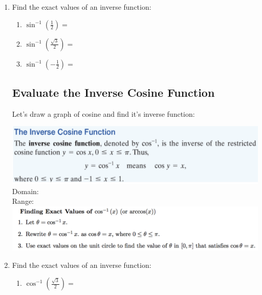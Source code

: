 \begin{enumerate}
\vspace{-.1in}
\item Find the exact values of an inverse function:

\begin{enumerate} 
\item $\displaystyle \sin^{-1}\left(\frac{1}{2}\right)=$\\[.5in]

\item $\displaystyle \sin^{-1}\left(\frac{\sqrt{3}}{2}\right)=$\\[.5in]

\item $\displaystyle \sin^{-1}\left(-\frac{1}{2}\right)=$\\[.5in]
\end{enumerate}




\subsection{Evaluate the Inverse Cosine Function}

Let's draw a graph of cosine and find it's inverse function:
\vfill

\includegraphics[scale=.7]{cosineinverse}\\
\noindent Domain:\\[.5in]
\noindent Range:\\

\newpage
\includegraphics[scale=.7]{findingcosineinverse}\\




\vspace{-.1in}
\item Find the exact values of an inverse function:
 \begin{enumerate}
\item $\displaystyle \cos^{-1}\left(\frac{\sqrt{3}}{2}\right)=$\\[.5in]


\end{enumerate}
\end{enumerate}
